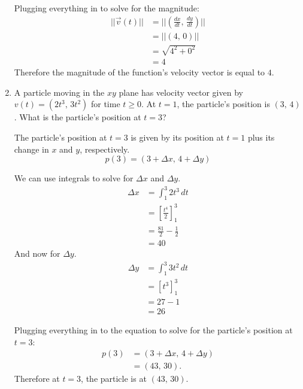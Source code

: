 \documentclass[12pt]{article}
\begin{document}
\begin{enumerate}
                Plugging everything in to solve for the magnitude:
                \begin{align*}
                    ||\vec{v}(t)|| &= ||(\frac{dx}{dt}, \, \frac{dy}{dt})|| \\[6pt]
                    &= ||(4, \, 0)|| \\
                    &= \sqrt{4^2 + 0^2} \\
                    &= 4
                \end{align*}
                Therefore the magnitude of the function's velocity vector is equal to $4$.
                \bigskip

                \item A particle moving in the $xy$ plane has velocity vector given by $v(t) = (2t^3, \, 3t^2)$ for time $t \ge 0$. At $t=1$, the particle's position is $(3, \, 4)$. What is the particle's position at $t=3$?

                The particle's position at $t=3$ is given by its position at $t=1$ plus its change in $x$ and $y$, respectively.
                \[ p(3) = (3 + \Delta x, \, 4 + \Delta y) \]

                We can use integrals to solve for $\Delta x$ and $\Delta y$.
                \begin{align*}
                    \Delta x &= \int_1^3 2t^3 \, dt \\
                    &= \left[ \frac{t^4}{2} \right]_1^3 \\[6pt]
                    &= \frac{81}{2} - \frac{1}{2} \\[6pt]
                    &= 40
                \end{align*}
                And now for $\Delta y$.
                \begin{align*}
                    \Delta y &= \int_1^3 3t^2 \, dt \\
                    &= \left[ t^3 \right]_1^3 \\
                    &= 27 - 1 \\
                    &= 26
                \end{align*}

                Plugging everything in to the equation to solve for the particle's position at $t=3$:
                \begin{align*}
                    p(3) &= (3 + \Delta x, \, 4 + \Delta y) \\
                    &= (43, \, 30).
                \end{align*}
                Therefore at $t=3$, the particle is at $(43, \, 30)$.
            \end{enumerate}
\end{document}
